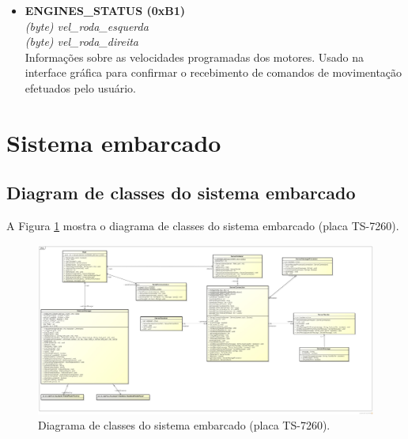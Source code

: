 \begin{itemize}
\begin{itemize}
      \item \textbf{ENGINES\_STATUS (0xB1)} \\
	\textit{(byte) vel\_roda\_esquerda}\\
	\textit{(byte) vel\_roda\_direita}\\
	Informações sobre as velocidades programadas dos motores. Usado na interface gráfica para confirmar o recebimento de comandos de movimentação efetuados pelo usuário.

	

    \end{itemize}
\end{itemize}


\section{Sistema embarcado}
\subsection{Diagram de classes do sistema embarcado}
A Figura \ref{fig:diagrama_classes_sist_embarcado} mostra o diagrama de classes do sistema embarcado (placa TS-7260).
\begin{figure}[H]
  \centering
  \includegraphics[width=\textwidth]{./figuras/sistEmbarcado/class_sistEmbarcado.jpg}
  \caption{Diagrama de classes do sistema embarcado (placa TS-7260).}
  \label{fig:diagrama_classes_sist_embarcado}
\end{figure}




